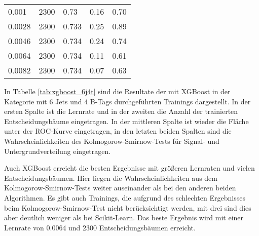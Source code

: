 \begin{table}[tbp]
\begin{center}
\begin{tabular}{lllll}
\num{0,001}  & \num{2300} & \num{0,73}  & \num{0,16} & \num{0,70}\\
\num{0,0028} & \num{2300} & \num{0,733} & \num{0,25} & \num{0,89}\\
\num{0,0046} & \num{2300} & \num{0,734} & \num{0,24} & \num{0,74}\\
\num{0,0064} & \num{2300} & \num{0,734} & \num{0,11} & \num{0,61}\\
\num{0,0082} & \num{2300} & \num{0,734} & \num{0,07} & \num{0,63}\\
  \hline
  \end{tabular}
  \end{center}
\end{table}

In Tabelle \ref{tab:xgboost_6j4t} sind die Resultate der mit XGBoost in der Kategorie mit 6 Jets und 4 B-Tags  durchgef\"uhrten Trainings dargestellt. In der ersten Spalte ist die Lernrate und in der zweiten die Anzahl der trainierten Entscheidungsb\"aume eingetragen. In der mittleren Spalte ist wieder die Fl\"ache unter der ROC-Kurve eingetragen, in den letzten beiden Spalten sind die Wahrscheinlichkeiten des Kolmogorow-Smirnow-Tests f\"ur Signal- und Untergrundverteilung eingetragen.

Auch XGBoost erreicht die besten Ergebnisse mit gr\"o\ss eren Lernraten und vielen Entscheidungsb\"aumen. Hier liegen die Wahrscheinlichkeiten aus dem Kolmogorow-Smirnow-Tests weiter auseinander als bei den anderen beiden Algorithmen. Es gibt auch Trainings, die aufgrund des schlechten Ergebnisses beim Kolmogorow-Smirnow-Test nicht ber\"ucksichtigt werden, mit drei sind dies aber deutlich weniger als bei Scikit-Learn. Das beste Ergebnis wird mit einer Lernrate von \num{0,0064} und \num{2300} Entscheidungsb\"aumen erreicht.

